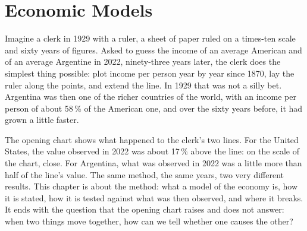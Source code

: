 \chapter{Economic Models}\label{ch:g10:economic-models}

Imagine a clerk in 1929 with a ruler, a sheet of paper ruled on a times-ten scale and sixty
years of figures. Asked to guess the income of an average American and of an average
Argentine in 2022, ninety-three years later, the clerk does the simplest thing possible: plot
income per person year by year since 1870, lay the ruler along the points, and extend the line.
In 1929 that was not a silly bet. Argentina was then one of the richer countries of the world,
with an income per person of about 58\,\% of the American one, and over the sixty years before,
it had grown a little faster.

The opening chart shows what happened to the clerk's two lines. For the United States, the value
observed in 2022 was about 17\,\% above the line: on the scale of the chart, close. For
Argentina, what was observed in 2022 was a little more than half of the line's value. The same
method, the same years, two very different results. This chapter is about the method: what a
model of the economy is, how it is stated, how it is tested against what was then observed, and
where it breaks. It ends with the question that the opening chart raises and does not answer:
when two things move together, how can we tell whether one causes the other?

